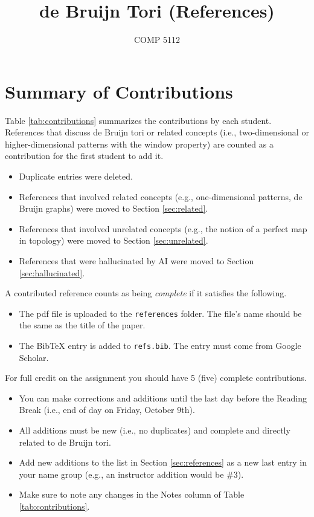 \documentclass{article}
\title{de Bruijn Tori (References)}
\author{COMP 5112}
\date{}
\begin{document}
\maketitle

\section{Summary of Contributions}
\label{sec:contributions}

Table \ref{tab:contributions} summarizes the contributions by each student.
References that discuss de Bruijn tori or related concepts (i.e., two-dimensional or higher-dimensional patterns with the window property) are counted as a contribution for the first student to add it.
\begin{itemize}[noitemsep,nolistsep]
  \item Duplicate entries were deleted.
  \item References that involved related concepts (e.g., one-dimensional patterns, de Bruijn graphs) were moved to Section \ref{sec:related}.
  \item References that involved unrelated concepts (e.g., the notion of a perfect map in topology) were moved to Section \ref{sec:unrelated}.
  \item References that were hallucinated by AI were moved to Section \ref{sec:hallucinated}.
\end{itemize}

\noindent
A contributed reference counts as being \emph{complete} if it satisfies the following.
\begin{itemize}[nolistsep,noitemsep]
  \item The pdf file is uploaded to the \texttt{references} folder.
  The file's name should be the same as the title of the paper.
  \item The BibTeX entry is added to \texttt{refs.bib}.
  The entry must come from Google Scholar.
\end{itemize}

\noindent
For full credit on the assignment you should have 5 (five) complete contributions.
\begin{itemize}[nolistsep,noitemsep]
  \item You can make corrections and additions until the last day before the Reading Break (i.e., end of day on Friday, October 9th).
  \item All additions must be new (i.e., no duplicates) and complete and directly related to de Bruijn tori.
  \item Add new additions to the list in Section \ref{sec:references} as a new last entry in your name group (e.g., an instructor addition would be \#3).
  \item Make sure to note any changes in the Notes column of Table \ref{tab:contributions}.
\end{itemize}
\end{document}

